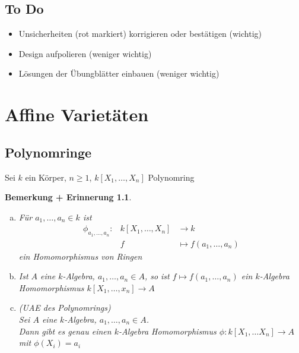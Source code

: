 \documentclass[a4paper,12pt]{report}
\theoremstyle{break}
\newtheorem{BemErinn}[Def]{Bemerkung + Erinnerung}
\theoremstyle{nonumberbreak}
\theoremstyle{nonumberplain}
\begin{document}
\section*{To Do}\begin{itemize}
\item Unsicherheiten (rot markiert) korrigieren oder best\"atigen (wichtig)
\item Design aufpolieren (weniger wichtig)
\item L\"osungen der \"Ubungbl\"atter einbauen (weniger wichtig)
\end{itemize}


\chapter{Affine Variet\"aten}

\section{Polynomringe}

Sei $k$ ein K\"orper, $n \geq 1$, $k[X_1,\dots,X_n]$ Polynomring

\begin{BemErinn}\label{bemerinn:1.1}
\begin{enumerate}[a)]
\item F\"ur $a_1, \dots, a_n \in k$ ist
	\[\begin{array}{lrl}
		\phi_{a_1,\dots,a_n}: &k[X_1, \dots, X_n] & \to k \\
		&f &\mapsto f(a_1, \dots, a_n)
	\end{array}\]
	ein Homomorphismus von Ringen
	
\item Ist $A$ eine $k$-Algebra, $a_1,\dots, a_n \in A$, so ist $f \mapsto f(a_1, \dots,a_n)$ ein $k$-Algebra Homomorphismus $k[X_1,\dots,x_n] \to A$
	
\item (UAE des Polynomrings)\\
	Sei $A$ eine $k$-Algebra, $a_1,\dots,a_n\in A$.\\
	Dann gibt es genau einen $k$-Algebra Homomorphismus $\phi:k[X_1,\dots X_n] \to A$ mit $\phi(X_i) = a_i$\label{bemerinn:1.1.c}
\end{enumerate}
\end{BemErinn}
\end{document}
